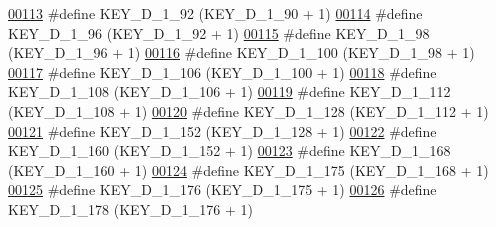 \begin{DoxyCode}
\hypertarget{dmp_key_8h_source.tex_l00113}{}\hyperlink{dmp_key_8h_add4af5ac6126e371445436c720b0ca38}{00113} \textcolor{preprocessor}{#define KEY\_D\_1\_92                  (KEY\_D\_1\_90 + 1)}
\hypertarget{dmp_key_8h_source.tex_l00114}{}\hyperlink{dmp_key_8h_ac6344fb39e1cba370c91ac2147eade2e}{00114} \textcolor{preprocessor}{#define KEY\_D\_1\_96                  (KEY\_D\_1\_92 + 1)}
\hypertarget{dmp_key_8h_source.tex_l00115}{}\hyperlink{dmp_key_8h_a26d9fb22968140339cec4da5c6feb8b1}{00115} \textcolor{preprocessor}{#define KEY\_D\_1\_98                  (KEY\_D\_1\_96 + 1)}
\hypertarget{dmp_key_8h_source.tex_l00116}{}\hyperlink{dmp_key_8h_a31535214bb1689eb7450b5671e285f91}{00116} \textcolor{preprocessor}{#define KEY\_D\_1\_100                 (KEY\_D\_1\_98 + 1)}
\hypertarget{dmp_key_8h_source.tex_l00117}{}\hyperlink{dmp_key_8h_a9def206df3655f69506bf353d0518745}{00117} \textcolor{preprocessor}{#define KEY\_D\_1\_106                 (KEY\_D\_1\_100 + 1)}
\hypertarget{dmp_key_8h_source.tex_l00118}{}\hyperlink{dmp_key_8h_accddb692fb2898367b88e281b73d9ce6}{00118} \textcolor{preprocessor}{#define KEY\_D\_1\_108                 (KEY\_D\_1\_106 + 1)}
\hypertarget{dmp_key_8h_source.tex_l00119}{}\hyperlink{dmp_key_8h_ac5c45471a712eb2970c85e03a4ab4f7d}{00119} \textcolor{preprocessor}{#define KEY\_D\_1\_112                 (KEY\_D\_1\_108 + 1)}
\hypertarget{dmp_key_8h_source.tex_l00120}{}\hyperlink{dmp_key_8h_ab17dc55a2d320dec80a00660e8ee0a75}{00120} \textcolor{preprocessor}{#define KEY\_D\_1\_128                 (KEY\_D\_1\_112 + 1)}
\hypertarget{dmp_key_8h_source.tex_l00121}{}\hyperlink{dmp_key_8h_a1e90238af4b07d64fe95d9d2e95d6021}{00121} \textcolor{preprocessor}{#define KEY\_D\_1\_152                 (KEY\_D\_1\_128 + 1)}
\hypertarget{dmp_key_8h_source.tex_l00122}{}\hyperlink{dmp_key_8h_aa715b843e85e6844277c39aef7b6b929}{00122} \textcolor{preprocessor}{#define KEY\_D\_1\_160                 (KEY\_D\_1\_152 + 1)}
\hypertarget{dmp_key_8h_source.tex_l00123}{}\hyperlink{dmp_key_8h_a69a742a9b4ee8a5ed4109b93e85604b5}{00123} \textcolor{preprocessor}{#define KEY\_D\_1\_168                 (KEY\_D\_1\_160 + 1)}
\hypertarget{dmp_key_8h_source.tex_l00124}{}\hyperlink{dmp_key_8h_ab6ca1f2a7510ffc9c23858f49843af88}{00124} \textcolor{preprocessor}{#define KEY\_D\_1\_175                 (KEY\_D\_1\_168 + 1)}
\hypertarget{dmp_key_8h_source.tex_l00125}{}\hyperlink{dmp_key_8h_aeff930bd54cde17b6cf381bc583bfc2d}{00125} \textcolor{preprocessor}{#define KEY\_D\_1\_176                 (KEY\_D\_1\_175 + 1)}
\hypertarget{dmp_key_8h_source.tex_l00126}{}\hyperlink{dmp_key_8h_a24dd0fa1bca546b44417d8437e16aa00}{00126} \textcolor{preprocessor}{#define KEY\_D\_1\_178                 (KEY\_D\_1\_176 + 1)}

\end{DoxyCode}
